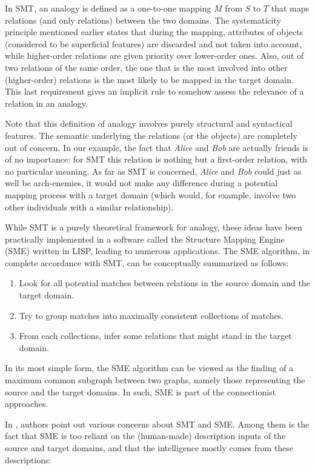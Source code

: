 In SMT, an analogy is defined as a one-to-one mapping $M$ from $S$ to $T$ that maps
relations (and only relations) between the two domains. The systematicity
principle mentioned earlier states that during the mapping, attributes of
objects (considered to be superficial features) are discarded and not taken
into account, while higher-order relations are given priority over lower-order
ones. Also, out of two relations of the same order, the one that is the most
involved into other (higher-order) relations is the most likely to be mapped in
the target domain. This last requirement gives an implicit rule to somehow
assess the relevance of a relation in an analogy.

Note that this definition of analogy involves purely structural and syntactical
features. The semantic underlying the relations (or the objects) are completely
out of concern. In our example, the fact that \textit{Alice} and \textit{Bob}
are actually friends is of no importance: for SMT this relation is nothing but
a first-order relation, with no particular meaning. As far as SMT is concerned,
\textit{Alice} and \textit{Bob} could just as well be arch-enemies, it would
not make any difference during a potential mapping process with a target domain
(which would, for example, involve two other individuals with a similar
relationship).

While SMT is a purely theoretical framework for analogy, these ideas have been
practically implemented in a software called the Structure Mapping Engine (SME)
\cite{FalForKenGen89} written in LISP, leading to numerous
applications. The SME algorithm, in complete accordance with SMT,
can be conceptually summarized as follows:
\begin{enumerate}
    \item Look for all potential matches between relations in the source domain
      and the target domain.
    \item Try to group matches into maximally consistent collections of
      matches.
    \item From each collections, infer some relations that might stand in the
      target domain.
\end{enumerate}
In its most simple form, the SME algorithm can be viewed as the finding of a
maximum common subgraph between two graphs, namely those representing the
source and the target domains. In such, SME is part of the connectionist
approaches.

In  \cite{ChaFreHof92}, authors point out various concerns about SMT and SME.
Among them is the fact that SME is too reliant on the (human-made) description
inputs of the source and target domains, and that the intelligence mostly comes
from these descriptions:


